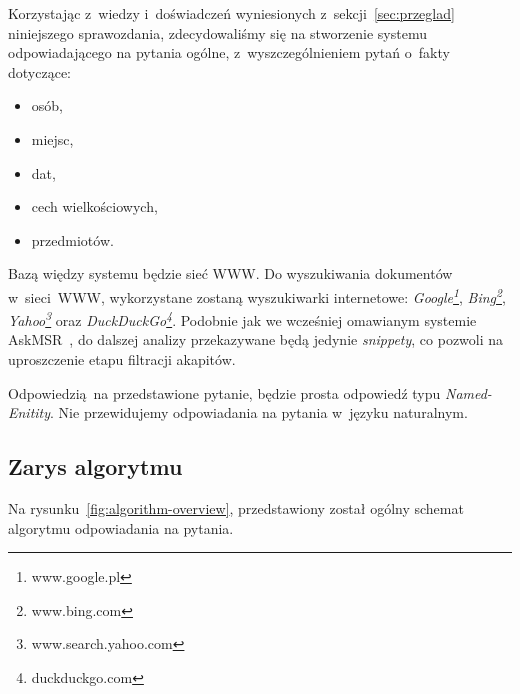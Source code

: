 Korzystając z~wiedzy i~doświadczeń wyniesionych z~sekcji~\ref{sec:przeglad} niniejszego sprawozdania, zdecydowaliśmy się na stworzenie systemu odpowiadającego na pytania ogólne, z~wyszczególnieniem pytań o~fakty dotyczące:
\begin{itemize}
    \item osób,
    \item miejsc,
    \item dat,
    \item cech wielkościowych,
    \item przedmiotów.
\end{itemize}

Bazą więdzy systemu będzie sieć WWW. Do wyszukiwania dokumentów w~sieci~WWW, wykorzystane zostaną wyszukiwarki internetowe: \emph{Google\footnote{www.google.pl}}, \emph{Bing\footnote{www.bing.com}}, \emph{Yahoo\footnote{www.search.yahoo.com}} oraz \emph{DuckDuckGo\footnote{duckduckgo.com}}. Podobnie jak we wcześniej omawianym systemie AskMSR~\cite{brill2002analysis}, do dalszej analizy przekazywane będą jedynie \emph{snippety}, co pozwoli na uproszczenie etapu filtracji akapitów.

Odpowiedzią na przedstawione pytanie, będzie prosta odpowiedź typu \emph{Named-Enitity}. Nie przewidujemy odpowiadania na pytania w~języku naturalnym.

\subsection{Zarys algorytmu}
Na rysunku~\ref{fig:algorithm-overview}, przedstawiony został ogólny schemat algorytmu odpowiadania na pytania.

